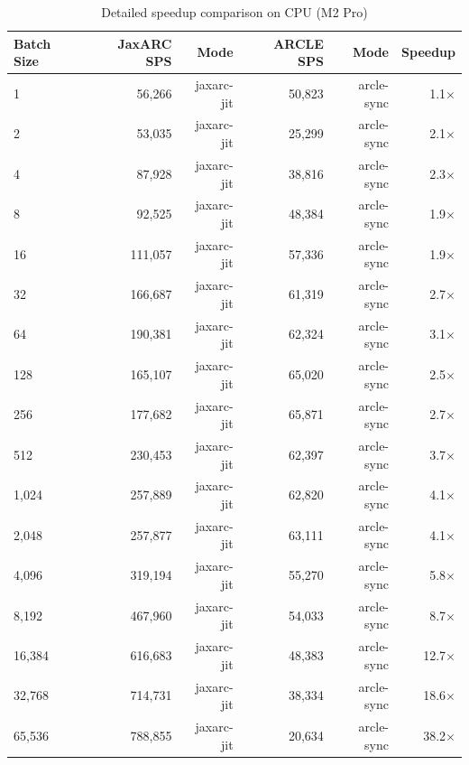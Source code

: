 \begin{table}[htbp]
\centering
\caption{Detailed speedup comparison on CPU (M2 Pro)}
\label{tab:speedup_cpu_m2_pro}
\small
\begin{tabular}{lrrrrr}
\toprule
Batch Size & JaxARC SPS & Mode & ARCLE SPS & Mode & Speedup \\
\midrule
1 & 56,266 & jaxarc-jit & 50,823 & arcle-sync & 1.1$\times$ \\
2 & 53,035 & jaxarc-jit & 25,299 & arcle-sync & 2.1$\times$ \\
4 & 87,928 & jaxarc-jit & 38,816 & arcle-sync & 2.3$\times$ \\
8 & 92,525 & jaxarc-jit & 48,384 & arcle-sync & 1.9$\times$ \\
16 & 111,057 & jaxarc-jit & 57,336 & arcle-sync & 1.9$\times$ \\
32 & 166,687 & jaxarc-jit & 61,319 & arcle-sync & 2.7$\times$ \\
64 & 190,381 & jaxarc-jit & 62,324 & arcle-sync & 3.1$\times$ \\
128 & 165,107 & jaxarc-jit & 65,020 & arcle-sync & 2.5$\times$ \\
256 & 177,682 & jaxarc-jit & 65,871 & arcle-sync & 2.7$\times$ \\
512 & 230,453 & jaxarc-jit & 62,397 & arcle-sync & 3.7$\times$ \\
1,024 & 257,889 & jaxarc-jit & 62,820 & arcle-sync & 4.1$\times$ \\
2,048 & 257,877 & jaxarc-jit & 63,111 & arcle-sync & 4.1$\times$ \\
4,096 & 319,194 & jaxarc-jit & 55,270 & arcle-sync & 5.8$\times$ \\
8,192 & 467,960 & jaxarc-jit & 54,033 & arcle-sync & 8.7$\times$ \\
16,384 & 616,683 & jaxarc-jit & 48,383 & arcle-sync & 12.7$\times$ \\
32,768 & 714,731 & jaxarc-jit & 38,334 & arcle-sync & 18.6$\times$ \\
65,536 & 788,855 & jaxarc-jit & 20,634 & arcle-sync & 38.2$\times$ \\
\bottomrule
\end{tabular}
\end{table}


